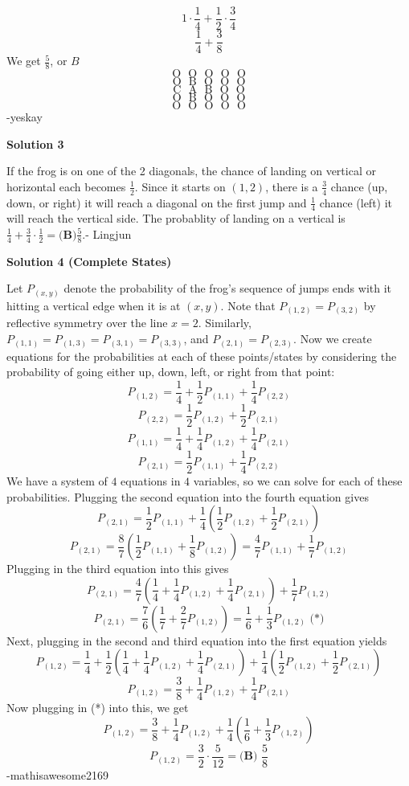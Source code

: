 \begin{enumerate}
 

 \[1 \cdot \frac{1}{4} + \frac{1}{2} \cdot \frac{3}{4}\]
 \[\frac{1}{4} + \frac{3}{8}\]We get $\frac{5}{8}$, or $B$
 \[\text{O}\ \ \ \text{O}\ \ \ \text{O}\ \ \ \text{O}\ \ \ \text{O}\] 
 \[\text{O}\ \ \ \text{B}\ \ \ \text{O}\ \ \ \text{O}\ \ \ \text{O}\]
 \[\text{C}\ \ \ \text{A}\ \ \ \text{B}\ \ \ \text{O}\ \ \ \text{O}\]
 \[\text{O}\ \ \ \text{B}\ \ \ \text{O}\ \ \ \text{O}\ \ \ \text{O}\]
 \[\text{O}\ \ \ \text{O}\ \ \ \text{O}\ \ \ \text{O}\ \ \ \text{O}\]-yeskay

 



\textbf{Solution 3}

If the frog is on one of the 2 diagonals, the chance of landing on vertical or horizontal each becomes $\frac{1}{2}$. Since it starts on $(1,2)$, there is a $\frac{3}{4}$ chance (up, down, or right) it will reach a diagonal on the first jump and $\frac{1}{4}$ chance (left) it will reach the vertical side. The probablity of landing on a vertical is $\frac{1}{4}+\frac{3}{4} \cdot \frac{1}{2}=\boxed{\textbf{(B)} \frac{5}{8}}$.- Lingjun

 



\textbf{Solution 4 (Complete States)}

Let $P_{(x,y)}$ denote the probability of the frog's sequence of jumps ends with it hitting a vertical edge when it is at $(x,y)$. Note that $P_{(1,2)}=P_{(3,2)}$ by reflective symmetry over the line $x=2$. Similarly, $P_{(1,1)}=P_{(1,3)}=P_{(3,1)}=P_{(3,3)}$, and $P_{(2,1)}=P_{(2,3)}$. Now we create equations for the probabilities at each of these points/states by considering the probability of going either up, down, left, or right from that point: 
 \[P_{(1,2)}=\frac{1}{4}+\frac{1}{2}P_{(1,1)}+\frac{1}{4}P_{(2,2)}\]
 \[P_{(2,2)}=\frac{1}{2}P_{(1,2)}+\frac{1}{2}P_{(2,1)}\]
 \[P_{(1,1)}=\frac{1}{4}+\frac{1}{4}P_{(1,2)}+\frac{1}{4}P_{(2,1)}\]
 \[P_{(2,1)}=\frac{1}{2}P_{(1,1)}+\frac{1}{4}P_{(2,2)}\]We have a system of $4$ equations in $4$ variables, so we can solve for each of these probabilities. Plugging the second equation into the fourth equation gives 
 \[P_{(2,1)}=\frac{1}{2}P_{(1,1)}+\frac{1}{4}\left(\frac{1}{2}P_{(1,2)}+\frac{1}{2}P_{(2,1)}\right)\]
 \[P_{(2,1)}=\frac{8}{7}\left(\frac{1}{2}P_{(1,1)}+\frac{1}{8}P_{(1,2)}\right)=\frac{4}{7}P_{(1,1)}+\frac{1}{7}P_{(1,2)}\]Plugging in the third equation into this gives 
 \[P_{(2,1)}=\frac{4}{7}\left(\frac{1}{4}+\frac{1}{4}P_{(1,2)}+\frac{1}{4}P_{(2,1)}\right)+\frac{1}{7}P_{(1,2)}\]
 \[P_{(2,1)}=\frac{7}{6}\left(\frac{1}{7}+\frac{2}{7}P_{(1,2)}\right)=\frac{1}{6}+\frac{1}{3}P_{(1,2)}\text{    (*)}\]Next, plugging in the second and third equation into the first equation yields 
 \[P_{(1,2)}=\frac{1}{4}+\frac{1}{2}\left(\frac{1}{4}+\frac{1}{4}P_{(1,2)}+\frac{1}{4}P_{(2,1)}\right)+\frac{1}{4}\left(\frac{1}{2}P_{(1,2)}+\frac{1}{2}P_{(2,1)}\right)\]
 \[P_{(1,2)}=\frac{3}{8}+\frac{1}{4}P_{(1,2)}+\frac{1}{4}P_{(2,1)}\]Now plugging in (*) into this, we get 
 \[P_{(1,2)}=\frac{3}{8}+\frac{1}{4}P_{(1,2)}+\frac{1}{4}\left(\frac{1}{6}+\frac{1}{3}P_{(1,2)}\right)\]
 \[P_{(1,2)}=\frac{3}{2}\cdot\frac{5}{12}=\boxed{\textbf{(B) }\frac{5}{8}}\]-mathisawesome2169


\end{enumerate}
